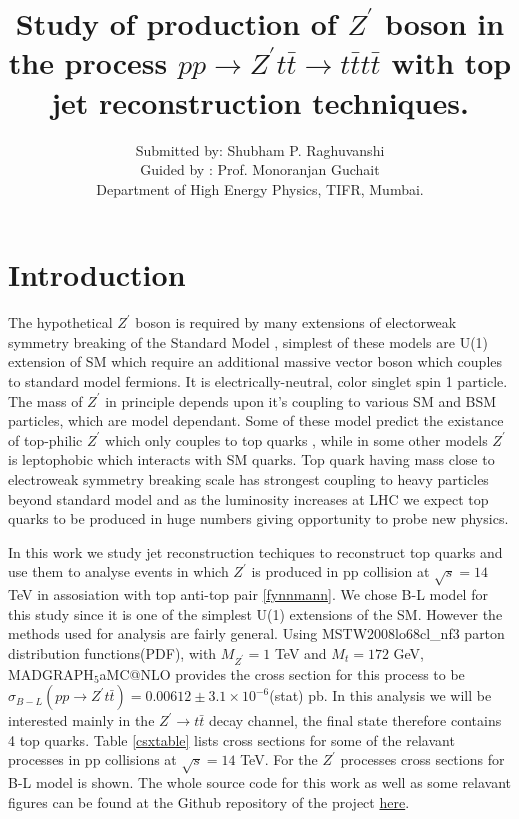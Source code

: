 \documentclass[12pt,a4paper]{article}		%
\title{\textbf { Study of production of $Z^\prime$ boson in the process $ pp \to Z^\prime t \bar{t} \to t \bar{t} t \bar{t} $ with top jet reconstruction techniques.  } }
\author{Submitted by: Shubham P. Raghuvanshi \\ Guided by : Prof. Monoranjan Guchait \\ Department of High Energy Physics, TIFR, Mumbai.}
\begin{document}
\maketitle
\thispagestyle{empty}
\newpage
\tableofcontents
\newpage
\section{Introduction}


The hypothetical $Z^\prime$ boson is required by many extensions of electorweak symmetry breaking of the Standard Model \cite{paul,zpdg}, simplest of these models are U(1) extension of SM which require an additional massive vector boson which couples to standard model fermions. It is electrically-neutral, color singlet spin 1 particle. The mass of $Z^\prime$ in principle depends upon it's coupling to various SM and BSM particles, which are model dependant. Some of these model predict the existance of top-philic $Z^\prime$ which only couples to top quarks \cite{tpz}, while in some other models $Z^\prime$ is leptophobic which interacts with SM quarks. Top quark having mass close to electroweak symmetry breaking scale has strongest coupling to heavy particles beyond standard model and as the luminosity increases at LHC we expect top quarks to be produced in huge numbers giving opportunity to probe new physics.          

In this work we study jet reconstruction techiques to reconstruct top quarks and use them to analyse events in which $Z^\prime$ is produced in pp collision at $\sqrt{s} = 14$ TeV in assosiation with top anti-top pair \ref{fynnmann}. We chose B-L model \cite{bl} for this study since it is one of the simplest U(1) extensions of the SM. However the methods used for analysis are fairly general. Using MSTW2008lo68cl\_nf3 \cite{pdfsets} parton distribution functions(PDF), with $M_{Z^\prime} = 1$ TeV and $M_t = 172$ GeV, $ \text{MADGRAPH}_5$aMC@NLO \cite{mad1,mad2} provides the cross section for this process to be $ \sigma_{B-L}( p p \to Z^\prime t \bar{t}) = 0.00612 \pm 3.1 \times 10^{-6}$(stat) pb. In this analysis we will be interested mainly in the $Z^\prime \to t \bar{t}$ decay channel, the final state therefore contains 4 top quarks. Table \ref{csxtable} lists cross sections for some of the relavant processes in pp collisions at $\sqrt{s}= 14$ TeV. For the $Z^\prime$ processes cross sections for B-L model is shown. The whole source code for this work as well as some relavant figures can be found at the Github repository of the project \href{https://github.com/ShubhamRaghuvanshi/departmental_project-2}{here}.
\end{document}
